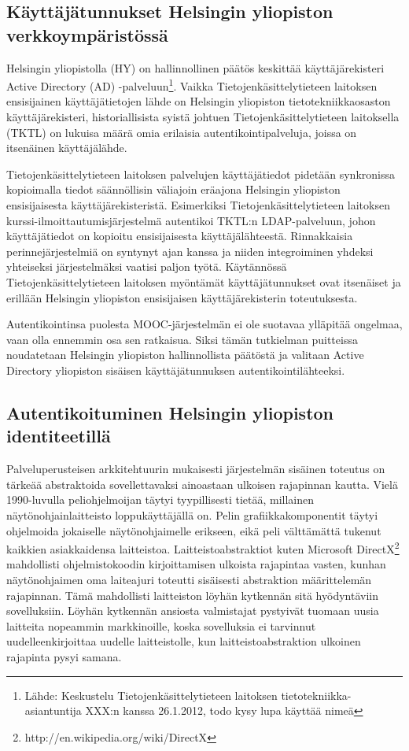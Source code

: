 \documentclass[finnish,gradu]{tktltiki}
\begin{document}
  \subsection{Käyttäjätunnukset Helsingin yliopiston verkkoympäristössä} %
  \label{sub:autentikointi_helsingin_yliopiston_verkkoympäristössä}

  Helsingin yliopistolla (HY) on hallinnollinen päätös keskittää käyttäjärekisteri Active Directory (AD) -palveluun\footnote{Lähde: Keskustelu Tietojenkäsittelytieteen laitoksen tietotekniikka-asiantuntija XXX:n kanssa 26.1.2012, todo kysy lupa käyttää nimeä}. Vaikka Tietojenkäsittelytieteen laitoksen ensisijainen käyttäjätietojen lähde on Helsingin yliopiston tietotekniikkaosaston käyttäjärekisteri, historiallisista syistä johtuen Tietojenkäsittelytieteen laitoksella (TKTL) on lukuisa määrä omia erilaisia autentikointipalveluja, joissa on itsenäinen käyttäjälähde.

  Tietojenkäsittelytieteen laitoksen palvelujen käyttäjätiedot pidetään synkronissa kopioimalla tiedot säännöllisin väliajoin eräajona Helsingin yliopiston ensisijaisesta käyttäjärekisteristä. Esimerkiksi Tietojenkäsittelytieteen laitoksen kurssi-ilmoittautumisjärjestelmä autentikoi TKTL:n LDAP-palveluun, johon käyttäjätiedot on kopioitu ensisijaisesta käyttäjälähteestä. Rinnakkaisia perinnejärjestelmiä on syntynyt ajan kanssa ja niiden integroiminen yhdeksi yhteiseksi järjestelmäksi vaatisi paljon työtä. Käytännössä Tietojenkäsittelytieteen laitoksen myöntämät käyttäjätunnukset ovat itsenäiset ja erillään Helsingin yliopiston ensisijaisen käyttäjärekisterin toteutuksesta.

  Autentikointinsa puolesta MOOC-järjestelmän ei ole suotavaa ylläpitää ongelmaa, vaan olla ennemmin osa sen ratkaisua. Siksi tämän tutkielman puitteissa noudatetaan Helsingin yliopiston hallinnollista päätöstä ja valitaan Active Directory yliopiston sisäisen käyttäjätunnuksen autentikointilähteeksi.


  \subsection{Autentikoituminen Helsingin yliopiston identiteetillä} %
  \label{sub:autentikointi_helsingin_yliopiston_id}

  Palveluperusteisen arkkitehtuurin mukaisesti järjestelmän sisäinen toteutus on tärkeää abstraktoida sovellettavaksi ainoastaan ulkoisen rajapinnan kautta. Vielä 1990-luvulla peliohjelmoijan täytyi tyypillisesti tietää, millainen näytönohjainlaitteisto loppukäyttäjällä on. Pelin grafiikkakomponentit täytyi ohjelmoida jokaiselle näytönohjaimelle erikseen, eikä peli välttämättä tukenut kaikkien asiakkaidensa laitteistoa. Laitteistoabstraktiot kuten Microsoft DirectX\footnote{http://en.wikipedia.org/wiki/DirectX} mahdollisti ohjelmistokoodin kirjoittamisen ulkoista rajapintaa vasten, kunhan näytönohjaimen oma laiteajuri toteutti sisäisesti abstraktion määrittelemän rajapinnan. Tämä mahdollisti laitteiston löyhän kytkennän sitä hyödyntäviin sovelluksiin. Löyhän kytkennän ansiosta valmistajat pystyivät tuomaan uusia laitteita nopeammin markkinoille, koska sovelluksia ei tarvinnut uudelleenkirjoittaa uudelle laitteistolle, kun laitteistoabstraktion ulkoinen rajapinta pysyi samana.
\end{document}
